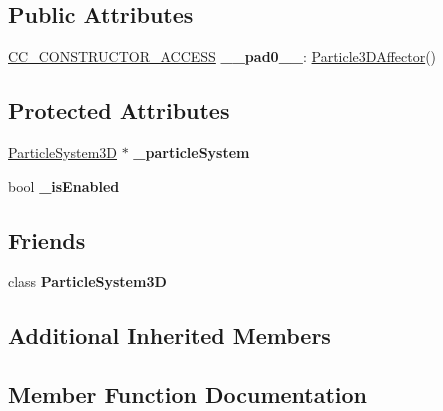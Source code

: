 \subsection*{Public Attributes}
\begin{DoxyCompactItemize}
\item 
\mbox{\label{classParticle3DAffector_ae1adc9cd8d2e6ceb2a03c7572421ed7d}} 
\hyperlink{_2cocos2d_2cocos_2base_2ccConfig_8h_a25ef1314f97c35a2ed3d029b0ead6da0}{C\+C\+\_\+\+C\+O\+N\+S\+T\+R\+U\+C\+T\+O\+R\+\_\+\+A\+C\+C\+E\+SS} {\bfseries \+\_\+\+\_\+pad0\+\_\+\+\_\+}\+: \hyperlink{classParticle3DAffector}{Particle3\+D\+Affector}()
\end{DoxyCompactItemize}
\subsection*{Protected Attributes}
\begin{DoxyCompactItemize}
\item 
\mbox{\label{classParticle3DAffector_aa9827df7e58128eebfd28d218fd387dc}} 
\hyperlink{classParticleSystem3D}{Particle\+System3D} $\ast$ {\bfseries \+\_\+particle\+System}
\item 
\mbox{\label{classParticle3DAffector_a94e03c6c1a6718275af51071584dfb5f}} 
bool {\bfseries \+\_\+is\+Enabled}
\end{DoxyCompactItemize}
\subsection*{Friends}
\begin{DoxyCompactItemize}
\item 
\mbox{\label{classParticle3DAffector_a372ad87c704d67c7a8060c019dba790b}} 
class {\bfseries Particle\+System3D}
\end{DoxyCompactItemize}
\subsection*{Additional Inherited Members}


\subsection{Member Function Documentation}
\mbox{\label{classParticle3DAffector_a5836aa8d810adcaefd9ba19fd40e3615}} 

